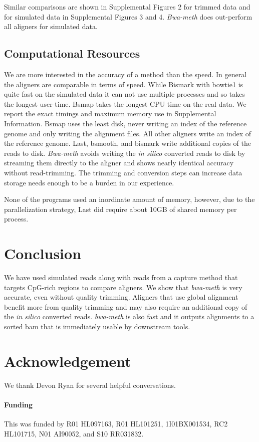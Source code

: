 \documentclass{bioinfo}
\begin{document}
Similar comparisons are shown in Supplemental Figures 2
for trimmed data and for simulated data in Supplemental Figures 3 and 4.
\textit{Bwa-meth} does out-perform all aligners for simulated data.

\subsection{Computational Resources}
We are more interested in the accuracy of a
method than the speed. In general the aligners are comparable in terms of
speed. While Bismark with bowtie1 is quite fast on the simulated data it
can not use multiple processes and so takes the longest user-time. Bsmap
takes the longest CPU time on the real data. We report the exact 
timings and maximum memory use in Supplemental Information.
Bsmap uses the least disk, never writing an index of the reference genome
and only writing the alignment files. All other aligners write an index of
the reference genome. Last, bsmooth, and bismark write additional copies of the
reads to disk.
\textit{Bwa-meth} avoids writing the \emph{in silico}
converted reads to disk by streaming them directly to the aligner and shows
nearly identical accuracy without read-trimming. The trimming and conversion
steps can increase data storage needs enough to be a burden in our experience. 

None of the programs used an inordinate amount of memory, however, due to
the parallelization strategy, Last did require about 10GB of shared memory
per process.

\section{Conclusion}
We have used simulated reads along with reads from a capture method that
targets CpG-rich regions to compare aligners.
We show that \textit{bwa-meth} is very accurate, even without quality trimming.
Aligners that use global alignment benefit more from quality trimming and may
also require an additional copy of the \emph{in silico} converted reads.
\textit{bwa-meth} is also fast and it outputs alignments to a sorted bam
that is immediately usable by downstream tools.

\section*{Acknowledgement}
We thank Devon Ryan for several helpful conversations.
\paragraph{Funding\textcolon} This was funded by R01 HL097163, R01 HL101251, 1I01BX001534, RC2 HL101715, N01 AI90052, and S10 RR031832.
%
%
%
%
%
%
%
%
%



    
\end{document}
